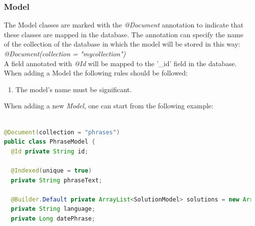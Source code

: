 \subsubsection{Model}
The Model classes are marked with the \textit{@Document} annotation to indicate that these classes are mapped in the database. The annotation can specify the name of the collection of the database in which the model will be stored in this way:\\ \textit{@Document(collection = "mycollection")}\\
A field annotated with \textit{@Id} will be mapped to the '\_id' field in the database.\\
When adding a Model the following rules should be followed: 
\begin{enumerate}
\item The model's name must be significant.
\end{enumerate}

When adding a new \textit{Model}, one can start from the following example:
\begin{lstlisting}[language=Java]

@Document(collection = "phrases")
public class PhraseModel {
  @Id private String id;

  @Indexed(unique = true)
  private String phraseText;

  @Builder.Default private ArrayList<SolutionModel> solutions = new ArrayList<>();
  private String language;
  private Long datePhrase;
 \end{lstlisting}
 
